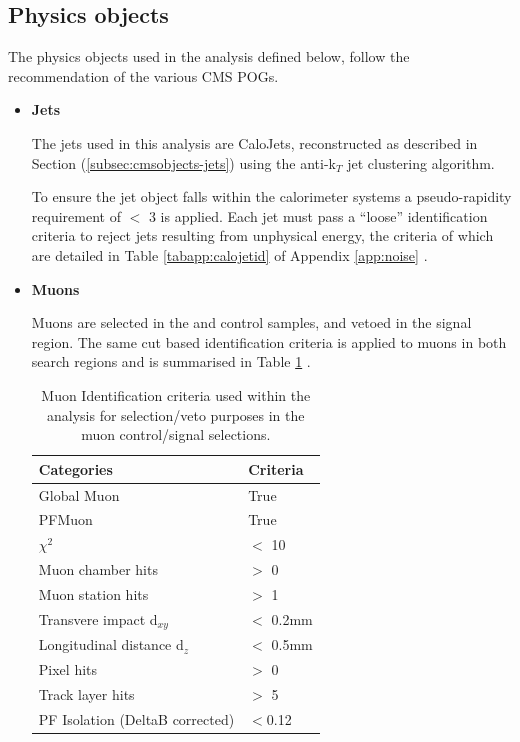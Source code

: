 \subsection{Physics objects}
\label{subsec:physicsobjects}

The physics objects used in the analysis defined below, follow the recommendation of the various \ac{CMS} \acf{POGs}. 

\begin{itemize}

\item \textbf{Jets}

The jets used in this analysis are CaloJets, reconstructed as described in Section (\ref{subsec:cmsobjects-jets}) using the anti-k$_{T}$ jet clustering algorithm. 

To ensure the jet object falls within the calorimeter systems a pseudo-rapidity requirement of \abeta $<$ 3 is applied. Each jet must pass a ``loose'' identification criteria to reject jets resulting from unphysical energy, the criteria of which are detailed in Table \ref{tabapp:calojetid} of Appendix \ref{app:noise}  \cite{CMS-PAS-JME-09-008}.

\item \textbf{Muons}

Muons are selected in the \mupjets and \dimupjets control samples, and vetoed in the signal region. The same cut based identification criteria is applied to muons in both search regions and is summarised in Table \ref{tab:muonidtable} \cite{1748-0221-7-10-P10002}.

\begin{table}[h!]
\footnotesize
\begin{center}
\begin{tabular*}{0.5\textwidth}{@{\extracolsep{\fill}}ll}
\cline{1-2}
Categories & Criteria \\ 
\hline\hline
Global Muon & True \\
PFMuon & True \\
$\chi^{2}$ & $<$ 10 \\
Muon chamber hits & $>$ 0 \\
Muon station hits & $>$ 1 \\
Transvere impact d$_{xy}$ & $<$ 0.2mm \\
Longitudinal distance d$_{z}$ & $<$ 0.5mm \\
Pixel hits & $>$ 0\\
Track layer hits & $>$ 5 \\
PF Isolation (DeltaB corrected) & $<$0.12 \\
\cline{1-2}
\end{tabular*}
\end{center}
\caption[Muon Identification criteria used within the analysis for selection/veto purposes in the muon control/signal selections.]{Muon Identification criteria used within the analysis for selection/veto purposes in the muon control/signal selections.}
\label{tab:muonidtable}
\end{table}


\end{itemize}
